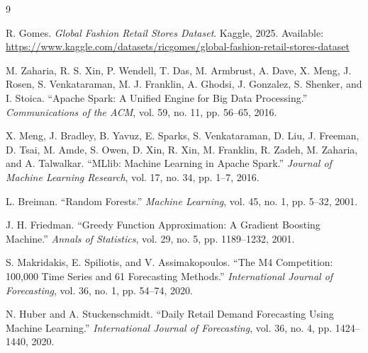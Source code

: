 \documentclass[11pt,a4paper]{article}
\begin{document}
\begin{thebibliography}{9}

R. Gomes. \textit{Global Fashion Retail Stores Dataset}. Kaggle, 2025. Available: \url{https://www.kaggle.com/datasets/ricgomes/global-fashion-retail-stores-dataset}

M. Zaharia, R. S. Xin, P. Wendell, T. Das, M. Armbrust, A. Dave, X. Meng, J. Rosen, S. Venkataraman, M. J. Franklin, A. Ghodsi, J. Gonzalez, S. Shenker, and I. Stoica. ``Apache Spark: A Unified Engine for Big Data Processing.'' \textit{Communications of the ACM}, vol. 59, no. 11, pp. 56--65, 2016.

X. Meng, J. Bradley, B. Yavuz, E. Sparks, S. Venkataraman, D. Liu, J. Freeman, D. Tsai, M. Amde, S. Owen, D. Xin, R. Xin, M. Franklin, R. Zadeh, M. Zaharia, and A. Talwalkar. ``MLlib: Machine Learning in Apache Spark.'' \textit{Journal of Machine Learning Research}, vol. 17, no. 34, pp. 1--7, 2016.

L. Breiman. ``Random Forests.'' \textit{Machine Learning}, vol. 45, no. 1, pp. 5--32, 2001.

J. H. Friedman. ``Greedy Function Approximation: A Gradient Boosting Machine.'' \textit{Annals of Statistics}, vol. 29, no. 5, pp. 1189--1232, 2001.

S. Makridakis, E. Spiliotis, and V. Assimakopoulos. ``The M4 Competition: 100,000 Time Series and 61 Forecasting Methods.'' \textit{International Journal of Forecasting}, vol. 36, no. 1, pp. 54--74, 2020.

N. Huber and A. Stuckenschmidt. ``Daily Retail Demand Forecasting Using Machine Learning.'' \textit{International Journal of Forecasting}, vol. 36, no. 4, pp. 1424--1440, 2020.

\end{thebibliography}
\end{document}
